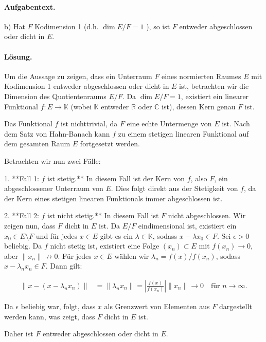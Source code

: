 \documentclass[11pt,a4paper]{article}
\begin{document}
\paragraph{Aufgabentext.}
b) Hat $F$ Kodimension 1 (d.h. $\operatorname{dim} E / F=1$ ), so ist $F$ entweder abgeschlossen oder dicht in $E$.

\paragraph{Lösung.}
Um die Aussage zu zeigen, dass ein Unterraum $F$ eines normierten Raumes $E$ mit Kodimension 1 entweder abgeschlossen oder dicht in $E$ ist, betrachten wir die Dimension des Quotientenraums $E/F$. Da $\operatorname{dim} E / F = 1$, existiert ein linearer Funktional $f: E \to \mathbb{K}$ (wobei $\mathbb{K}$ entweder $\mathbb{R}$ oder $\mathbb{C}$ ist), dessen Kern genau $F$ ist. 

Das Funktional $f$ ist nichttrivial, da $F$ eine echte Untermenge von $E$ ist. Nach dem Satz von Hahn-Banach kann $f$ zu einem stetigen linearen Funktional auf dem gesamten Raum $E$ fortgesetzt werden. 

Betrachten wir nun zwei Fälle:

1. **Fall 1: $f$ ist stetig.** In diesem Fall ist der Kern von $f$, also $F$, ein abgeschlossener Unterraum von $E$. Dies folgt direkt aus der Stetigkeit von $f$, da der Kern eines stetigen linearen Funktionals immer abgeschlossen ist.

2. **Fall 2: $f$ ist nicht stetig.** In diesem Fall ist $F$ nicht abgeschlossen. Wir zeigen nun, dass $F$ dicht in $E$ ist. Da $E/F$ eindimensional ist, existiert ein $x_0 \in E \setminus F$ und für jedes $x \in E$ gibt es ein $\lambda \in \mathbb{K}$, sodass $x - \lambda x_0 \in F$. Sei $\epsilon > 0$ beliebig. Da $f$ nicht stetig ist, existiert eine Folge $(x_n) \subset E$ mit $f(x_n) \to 0$, aber $\|x_n\| \not\to 0$. Für jedes $x \in E$ wählen wir $\lambda_n = f(x)/f(x_n)$, sodass $x - \lambda_n x_n \in F$. Dann gilt:

\begin{align*}
\|x - (x - \lambda_n x_n)\| &= \|\lambda_n x_n\| = \left|\frac{f(x)}{f(x_n)}\right| \|x_n\| \to 0 \quad \text{für } n \to \infty.
\end{align*}

Da $\epsilon$ beliebig war, folgt, dass $x$ als Grenzwert von Elementen aus $F$ dargestellt werden kann, was zeigt, dass $F$ dicht in $E$ ist.

Daher ist $F$ entweder abgeschlossen oder dicht in $E$.
\end{document}
